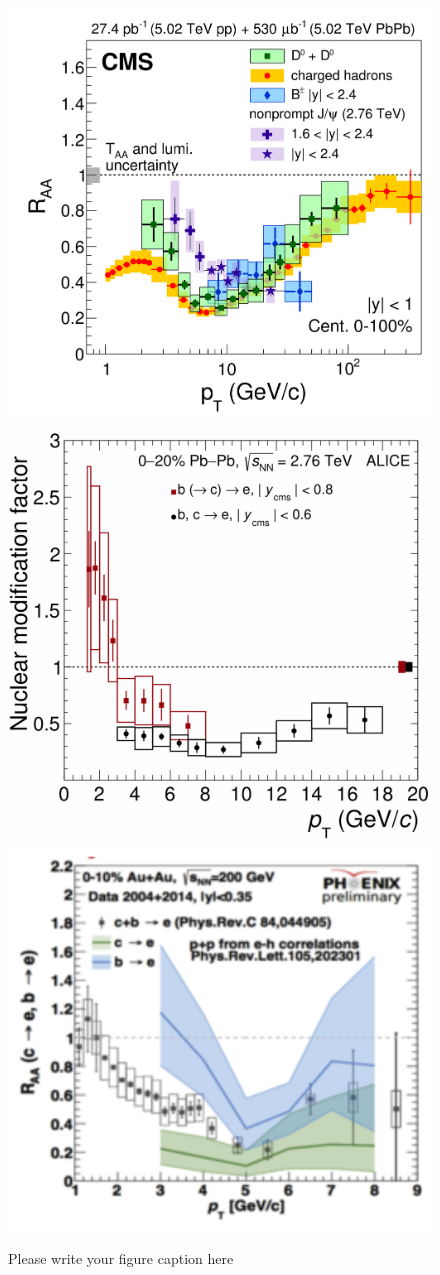 \documentclass{webofc}
\begin{document}
\begin{figure}[ht]
\centering
\includegraphics[width=.32\textwidth]{Plots/DBNonPromptRAACMS}
\includegraphics[width=.32\textwidth]{Plots/HFelectronsALICE}
\includegraphics[width=.32\textwidth]{Plots/BPHENIXAuAu}
\caption{Please write your figure caption here}
\label{fig:FlavourRAA}     
\end{figure}
\end{document}
